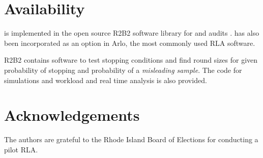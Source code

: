 \section{Availability}
\label{sec:avail}
\Providence is implemented in the open source R2B2 software library for \R and \B audits \cite{r2b2_anon}.
\Providence has also been incorporated as an option in Arlo, the most commonly used RLA software.

R2B2 contains software to test stopping conditions and find round sizes for given probability of stopping and probability of a \emph{misleading sample}. The code for simulations and workload and real time analysis is also provided.

\section{Acknowledgements}
\label{sec:ack}
The authors are grateful to the Rhode Island Board of Elections for conducting a pilot \Providence RLA.


